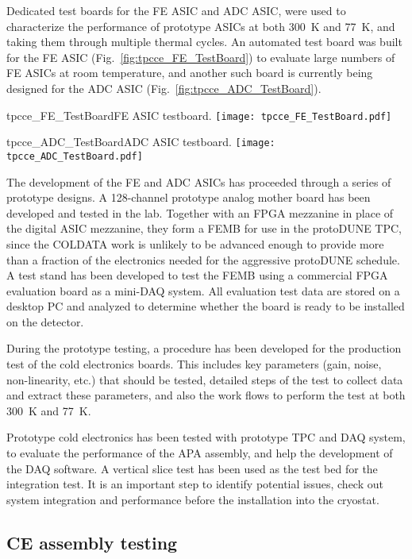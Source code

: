 Dedicated test boards for the FE ASIC and ADC ASIC,
were used to characterize the performance of prototype ASICs at both 300~K and 77~K,
and taking them through multiple thermal cycles.
An automated test board was built for the FE ASIC (Fig.~\ref{fig:tpcce_FE_TestBoard})
to evaluate large numbers of FE ASICs at room temperature,
and another such board is currently being designed for the ADC ASIC (Fig.~\ref{fig:tpcce_ADC_TestBoard}).

\begin{cdrfigure}{tpcce_FE_TestBoard}{FE ASIC testboard.}
\texttt{[image: tpcce\_FE\_TestBoard.pdf]}
\end{cdrfigure}
\begin{cdrfigure}{tpcce_ADC_TestBoard}{ADC ASIC testboard.}
\texttt{[image: tpcce\_ADC\_TestBoard.pdf]}
\end{cdrfigure}

The development of the FE and ADC ASICs has proceeded through a series of prototype designs.
A 128-channel prototype analog mother board has been developed and tested in the lab.
Together with an FPGA mezzanine in place of the digital ASIC mezzanine,
they form a FEMB for use in the protoDUNE TPC,
since the COLDATA work is unlikely to be advanced enough to
provide more than a fraction of the electronics needed for the aggressive protoDUNE schedule.
A test stand has been developed to test the FEMB
using a commercial FPGA evaluation board as a mini-DAQ system.
All evaluation test data are stored on a desktop PC and analyzed to
determine whether the board is ready to be installed on the detector.

During the prototype testing, a procedure has been developed for the production test of the cold electronics boards.
This includes key parameters (gain, noise, non-linearity, etc.) that should be tested,
detailed steps of the test to collect data and extract these parameters,
and also the work flows to perform the test at both 300~K and 77~K.

Prototype cold electronics has been tested with prototype TPC and DAQ system,
to evaluate the performance of the APA assembly, and help the development of the DAQ software.
A vertical slice test has been used as the test bed for the integration test.
It is an important step to identify potential issues, check out system integration and performance
before the installation into the cryostat.

\subsection{CE assembly testing}
\label{subsubsec:ce_install_assembly}

